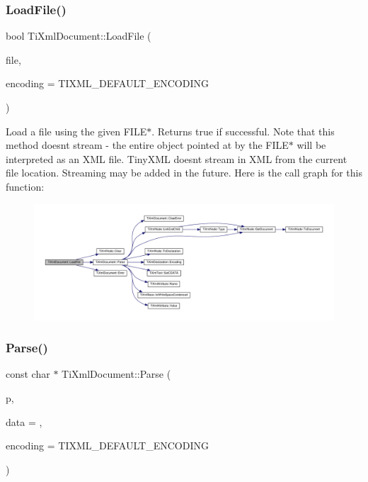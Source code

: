 \subsubsection{\texorpdfstring{Load\+File()}{LoadFile()}\hspace{0.1cm}{\footnotesize\ttfamily [2/2]}}
{\footnotesize\ttfamily bool Ti\+Xml\+Document\+::\+Load\+File (\begin{DoxyParamCaption}\item[{F\+I\+LE $\ast$}]{file,  }\item[{Ti\+Xml\+Encoding}]{encoding = {\ttfamily TIXML\+\_\+DEFAULT\+\_\+ENCODING} }\end{DoxyParamCaption})}

Load a file using the given F\+I\+L\+E$\ast$. Returns true if successful. Note that this method doesn\textquotesingle{}t stream -\/ the entire object pointed at by the F\+I\+L\+E$\ast$ will be interpreted as an X\+ML file. Tiny\+X\+ML doesn\textquotesingle{}t stream in X\+ML from the current file location. Streaming may be added in the future. Here is the call graph for this function\+:
\nopagebreak
\begin{figure}[H]
\begin{center}
\leavevmode
\includegraphics[width=350pt]{classTiXmlDocument_a41f6fe7200864d1dca663d230caf8db6_cgraph}
\end{center}
\end{figure}
\mbox{\label{classTiXmlDocument_a789ad2f06f93d52bdb5570b2f3670289}} 
\subsubsection{\texorpdfstring{Parse()}{Parse()}}
{\footnotesize\ttfamily const char $\ast$ Ti\+Xml\+Document\+::\+Parse (\begin{DoxyParamCaption}\item[{const char $\ast$}]{p,  }\item[{\hyperlink{classTiXmlParsingData}{Ti\+Xml\+Parsing\+Data} $\ast$}]{data = {},  }\item[{Ti\+Xml\+Encoding}]{encoding = {\ttfamily TIXML\+\_\+DEFAULT\+\_\+ENCODING} }\end{DoxyParamCaption})\hspace{0.3cm}{\ttfamily [virtual]}}

